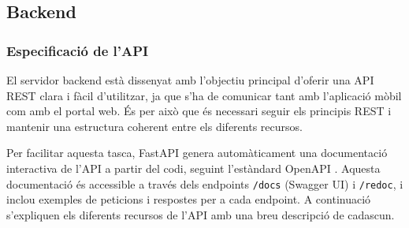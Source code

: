 \documentclass[11pt,a4paper]{report}
\begin{document}
\subsection{Backend}
\subsubsection{Especificació de l'API}
El servidor backend està dissenyat amb l'objectiu principal d'oferir una API REST clara i fàcil d'utilitzar, ja que s'ha de comunicar tant amb l'aplicació mòbil com amb el portal web. És per això que és necessari seguir els principis REST i mantenir una estructura coherent entre els diferents recursos.

Per facilitar aquesta tasca, FastAPI genera automàticament una documentació interactiva de l'API a partir del codi, seguint l'estàndard OpenAPI \cite{noauthor_openapi_nodate}. Aquesta documentació és accessible a través dels endpoints \texttt{/docs} (Swagger UI) i \texttt{/redoc}, i inclou exemples de peticions i respostes per a cada endpoint. A continuació s'expliquen els diferents recursos de l'API amb una breu descripció de cadascun.
\end{document}
